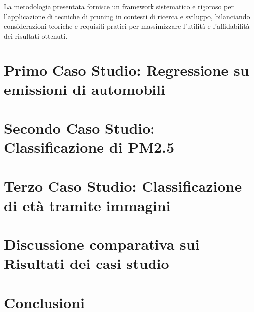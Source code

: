 \documentclass[a4paper,12pt]{report}
\begin{document}
	La metodologia presentata fornisce un framework sistematico e rigoroso per l'applicazione di tecniche di pruning in contesti di ricerca e sviluppo, bilanciando considerazioni teoriche e requisiti pratici per massimizzare l'utilità e l'affidabilità dei risultati ottenuti.
	
	\chapter{Primo Caso Studio: Regressione su emissioni di automobili}
	
	\chapter{Secondo Caso Studio: Classificazione di PM2.5}
	
	\chapter{Terzo Caso Studio: Classificazione di età tramite immagini}
	
	\chapter{Discussione comparativa sui Risultati dei casi studio}
	
	\chapter{Conclusioni}
	
	\nocite{*}
	
	
	
\end{document}
